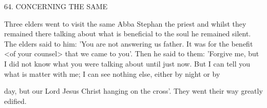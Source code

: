 64. CONCERNING THE SAME

Three elders went to visit the same Abba Stephan the priest and
whilst they remained there talking about what is beneficial to the
soul he remained silent. The elders said to him: 'You are not
answering us father. It was for the benefit <of your counsel> that
we came to you'. Then he said to them: 'Forgive me, but I did not
know what you were talking about until just now. But I can tell you
what is matter with me; I can see nothing else, either by night or by

day, but our Lord Jesus Christ hanging on the cross'. They went
their way greatly edified.

